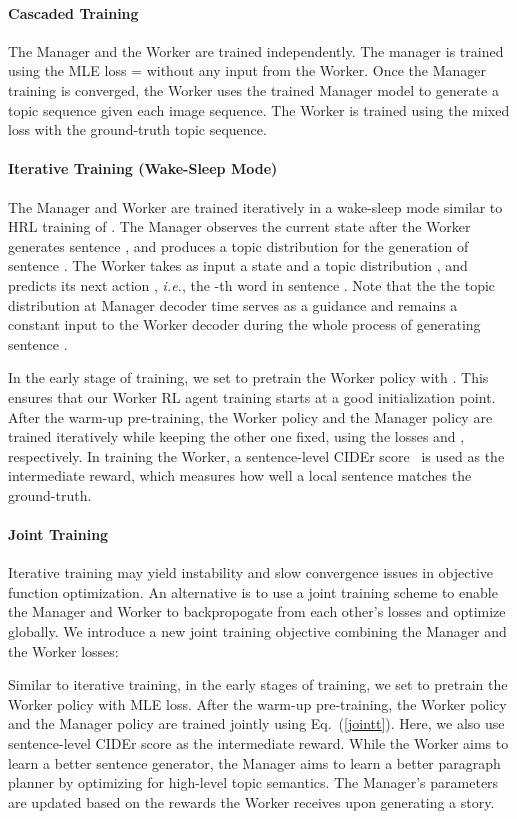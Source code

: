 \documentclass[letterpaper]{article} \usepackage{aaai19}  \usepackage{times}  \usepackage{helvet}  \usepackage{courier}  \usepackage{url}  \usepackage{graphicx}
\begin{document}
\paragraph{Cascaded Training}
The Manager and the Worker are trained independently. The manager is trained using the MLE loss  =  without any input from the Worker. Once the Manager training is converged, the Worker uses the trained Manager model to generate a topic sequence given each image sequence. 
The Worker is trained using the mixed loss  with the ground-truth topic sequence. 


\paragraph{Iterative Training (Wake-Sleep Mode)}
The Manager and Worker are trained iteratively in a wake-sleep mode similar to HRL training of \cite{wang2018video}.
The Manager observes the current state  after the Worker generates sentence , and produces a topic distribution  for the generation of sentence . The Worker takes as input a state  and a topic distribution , and predicts its next action , \emph{i.e.}, the -th word in sentence . Note that the the topic distribution  at Manager decoder time  serves as a guidance and remains a constant input to the Worker decoder during the whole process of generating sentence . 

In the early stage of training, we set  to pretrain the Worker policy with . This ensures that our Worker RL agent training starts at a good initialization point. 
After the warm-up pre-training, the Worker policy and the Manager policy are trained iteratively while keeping the other one fixed, using the losses  and , respectively. In training the Worker, a sentence-level CIDEr score~\cite{vedantam2015cider} is used as the intermediate reward, which measures how well a local sentence matches the ground-truth. 

\paragraph{Joint Training}
Iterative training may yield instability and slow convergence issues in objective function optimization. An alternative is to use a joint training scheme to enable the Manager and Worker to backpropogate from each other's losses and optimize globally. We introduce a new joint training objective combining the Manager and the Worker losses:

Similar to iterative training, in the early stages of training, we set  to pretrain the Worker policy with MLE loss. 
After the warm-up pre-training, the Worker policy and the Manager policy are trained jointly using Eq.~(\ref{jointt}). Here, we also use sentence-level CIDEr score as the intermediate reward. While the Worker aims to learn a better sentence generator, the Manager aims to learn a better paragraph planner by optimizing for high-level topic semantics. The Manager's parameters are updated based on the rewards the Worker receives upon generating a story.  
\end{document}
